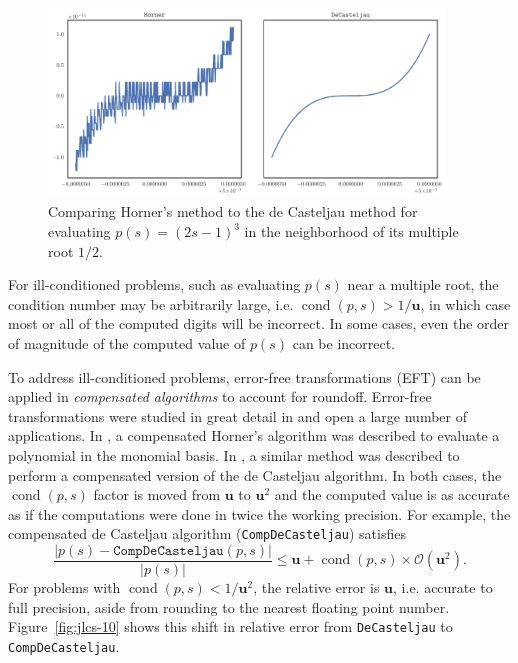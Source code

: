 \documentclass[letterpaper,10pt]{article}
\theoremstyle{definition}
\newcommand{\cond}[1]{\operatorname{cond}\left(#1\right)}
\newcommand{\mach}{\mathbf{u}}
\begin{document}
\begin{figure}
  \includegraphics[width=0.9375\textwidth]{../images/horner_inferior.pdf}
  \centering
  \captionsetup{width=.75\linewidth}
  \caption{Comparing Horner's method to the de Casteljau method for
    evaluating \(p(s) = (2s - 1)^3\) in the neighborhood of its
    multiple root \(1/2\).}
  \label{fig:horner-inferior}
\end{figure}

For ill-conditioned problems, such as evaluating \(p(s)\) near a
multiple root, the condition number may be arbitrarily large, i.e.
\(\cond{p, s} > 1 / \mach\), in
which case most or all of the computed digits will be incorrect.
In some cases, even the order of magnitude of the computed value
of \(p(s)\) can be incorrect.

To address ill-conditioned problems, error-free transformations (EFT) can
be applied in \textit{compensated algorithms} to account for roundoff.
Error-free transformations were studied in great detail in \cite{Ogita2005}
and open a large number of applications.
In \cite{langlois_et_al:DSP:2006:442}, a compensated Horner's algorithm was
described to evaluate a polynomial in the monomial basis. In \cite{Jiang2010},
a similar method was described to perform a compensated version of the de
Casteljau algorithm. In both cases, the \(\cond{p, s}\) factor is moved
from \(\mach\) to \(\mach^2\) and the computed value is as accurate
as if the computations were done in twice the working precision. For example,
the compensated de Casteljau algorithm (\texttt{CompDeCasteljau}) satisfies
\begin{equation}\label{de-casteljau-2-error}
  \frac{\left|p(s) - \mathtt{CompDeCasteljau}(p, s)\right|}{
    \left|p(s)\right|} \leq \mach + \cond{p, s} \times
    \mathcal{O}\left(\mach^2\right).
\end{equation}
For problems with \(\cond{p, s} < 1 / \mach^2\), the relative error
is \(\mach\), i.e. accurate to full precision, aside from rounding to the
nearest floating point number. Figure~\ref{fig:jlcs-10} shows this shift
in relative error from \texttt{DeCasteljau} to \texttt{CompDeCasteljau}.
\end{document}

